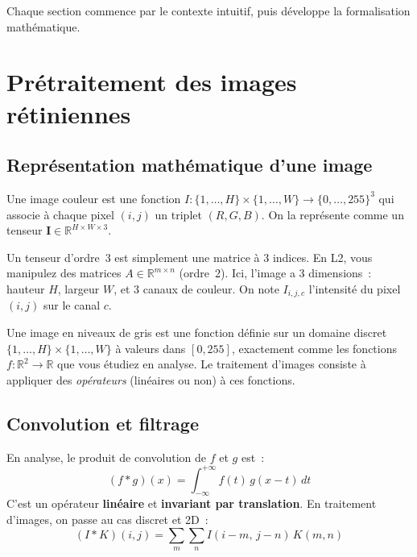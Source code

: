 \documentclass[11pt,a4paper]{article}
\newcommand{\R}{\mathbb{R}}
\begin{document}
Chaque section commence par le contexte intuitif, puis d\'eveloppe la formalisation math\'ematique.

\section{Pr\'etraitement des images r\'etiniennes}

\subsection{Repr\'esentation math\'ematique d'une image}

\begin{defbox}
Une image couleur est une fonction $I : \{1,\ldots,H\} \times \{1,\ldots,W\} \to \{0,\ldots,255\}^3$ qui associe \`a chaque pixel $(i,j)$ un triplet $(R,G,B)$. On la repr\'esente comme un tenseur $\mathbf{I} \in \R^{H \times W \times 3}$.
\end{defbox}

\begin{rappelbox}
Un tenseur d'ordre~3 est simplement une \og{}matrice \`a 3 indices\fg{}. En L2, vous manipulez des matrices $A \in \R^{m \times n}$ (ordre~2). Ici, l'image a 3 dimensions~: hauteur $H$, largeur $W$, et 3 canaux de couleur. On note $I_{i,j,c}$ l'intensit\'e du pixel $(i,j)$ sur le canal $c$.
\end{rappelbox}

\begin{intubox}
Une image en niveaux de gris est une fonction d\'efinie sur un domaine discret $\{1,\ldots,H\} \times \{1,\ldots,W\}$ \`a valeurs dans $[0,255]$, exactement comme les fonctions $f : \R^2 \to \R$ que vous \'etudiez en analyse. Le traitement d'images consiste \`a appliquer des \emph{op\'erateurs} (lin\'eaires ou non) \`a ces fonctions.
\end{intubox}

\subsection{Convolution et filtrage}

\begin{rappelbox}
En analyse, le produit de convolution de $f$ et $g$ est~:
\[
(f * g)(x) = \int_{-\infty}^{+\infty} f(t)\,g(x-t)\,dt
\]
C'est un op\'erateur \textbf{lin\'eaire} et \textbf{invariant par translation}. En traitement d'images, on passe au cas discret et 2D~:
\[
(I * K)(i,j) = \sum_{m} \sum_{n} I(i-m,\,j-n)\,K(m,n)
\]
\end{rappelbox}
\end{document}
